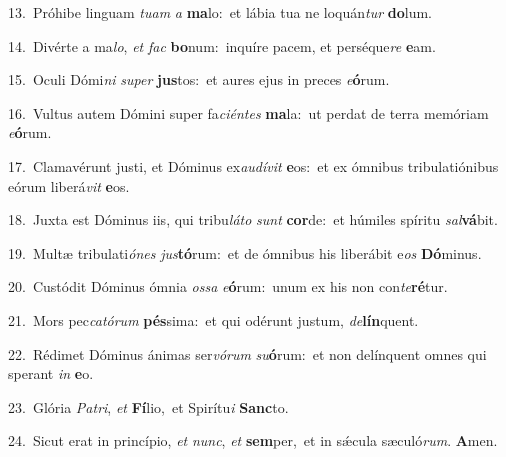 {\numbfont\textcolor{\numbcolor}{13.}}~Próhibe linguam \textit{tu}\-\textit{am} \textit{a} \textbf{ma}\-lo:~\star et lábia tua ne loquán\textit{tur} \textbf{do}\-lum.\par
{\numbfont\textcolor{\numbcolor}{14.}}~Divérte a ma\-\textit{lo}\-, \textit{et} \textit{fac} \textbf{bo}\-num:~\star inquíre pacem, et perséque\textit{re} \textbf{e}\-am.\par
{\numbfont\textcolor{\numbcolor}{15.}}~Oculi Dómi\textit{ni} \textit{su}\-\textit{per} \textbf{jus}\-tos:~\star et aures ejus in preces \textit{e}\-\textbf{ó}rum.\par
{\numbfont\textcolor{\numbcolor}{16.}}~Vultus autem Dómini super fa\-\textit{ci}\-\textit{én}\textit{tes} \textbf{ma}\-la:~\star ut perdat de terra memóriam \textit{e}\-\textbf{ó}rum.\par
{\numbfont\textcolor{\numbcolor}{17.}}~Clamavérunt justi, et Dóminus ex\-\textit{au}\-\textit{dí}\textit{vit} \textbf{e}\-os:~\star et ex ómnibus tribulatiónibus eórum liberá\textit{vit} \textbf{e}\-os.\par
{\numbfont\textcolor{\numbcolor}{18.}}~Juxta est Dóminus iis, qui tribu\-\textit{lá}\-\textit{to} \textit{sunt} \textbf{cor}\-de:~\star et húmiles spíritu \textit{sal}\-\textbf{vá}bit.\par
{\numbfont\textcolor{\numbcolor}{19.}}~Multæ tribulati\-\textit{ó}\-\textit{nes} \textit{jus}\-\textbf{tó}rum:~\star et de ómnibus his liberábit e\textit{os} \textbf{Dó}\-minus.\par
{\numbfont\textcolor{\numbcolor}{20.}}~Custódit Dóminus ómnia \textit{os}\-\textit{sa} \textit{e}\-\textbf{ó}rum:~\star unum ex his non con\-\textit{te}\-\textbf{ré}tur.\par
{\numbfont\textcolor{\numbcolor}{21.}}~Mors pec\-\textit{ca}\-\textit{tó}\textit{rum} \textbf{pés}\-sima:~\star et qui odérunt justum, \textit{de}\-\textbf{lín}quent.\par
{\numbfont\textcolor{\numbcolor}{22.}}~Rédimet Dóminus ánimas ser\-\textit{vó}\-\textit{rum} \textit{su}\-\textbf{ó}rum:~\star et non delínquent omnes qui sperant \textit{in} \textbf{e}\-o.\par
{\numbfont\textcolor{\numbcolor}{23.}}~Glória \textit{Pa}\-\textit{tri}, \textit{et} \textbf{Fí}\-lio,~\star et Spirítu\textit{i} \textbf{Sanc}\-to.\par
{\numbfont\textcolor{\numbcolor}{24.}}~Sicut erat in princípio, \textit{et} \textit{nunc}\-, \textit{et} \textbf{sem}\-per,~\star et in sǽcula sæculó\-\textit{rum}\-. \textbf{A}\-men.\par
